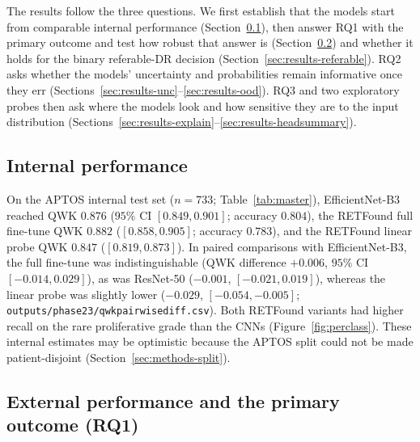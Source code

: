 \documentclass[journal]{IEEEtran}
\renewcommand{\_}{\origunderscore\allowbreak}
\begin{document}
The results follow the three questions. We first establish that the models start
from comparable internal performance (Section~\ref{sec:results-int}), then answer
RQ1 with the primary outcome and test how robust that answer is
(Section~\ref{sec:results-ext}) and whether it holds for the binary referable-DR
decision (Section~\ref{sec:results-referable}). RQ2 asks whether the models'
uncertainty and probabilities remain informative once they err
(Sections~\ref{sec:results-unc}--\ref{sec:results-ood}). RQ3 and two exploratory
probes then ask where the models look and how sensitive they are to the input
distribution (Sections~\ref{sec:results-explain}--\ref{sec:results-headsummary}).

\subsection{Internal performance}
\label{sec:results-int}

On the APTOS internal test set ($n=733$; Table~\ref{tab:master}),
EfficientNet-B3 reached QWK $0.876$ ($95\%$ CI $[0.849,0.901]$; accuracy
$0.804$), the RETFound full fine-tune QWK $0.882$ ($[0.858,0.905]$; accuracy
$0.783$), and the RETFound linear probe QWK $0.847$ ($[0.819,0.873]$). In
paired comparisons with EfficientNet-B3, the full fine-tune was
indistinguishable (QWK difference $+0.006$, $95\%$ CI $[-0.014,0.029]$), as was
ResNet-50 ($-0.001$, $[-0.021,0.019]$), whereas the linear probe was slightly
lower ($-0.029$, $[-0.054,-0.005]$;
\texttt{outputs/\allowbreak{}phase23/\allowbreak{}qwk\_pairwise\_diff.csv}). Both
RETFound variants had higher recall on the rare proliferative grade than the
CNNs (Figure~\ref{fig:perclass}). These internal estimates may be optimistic
because the APTOS split could not be made patient-disjoint
(Section~\ref{sec:methods-split}).

\subsection{External performance and the primary outcome (RQ1)}
\label{sec:results-ext}
\end{document}

